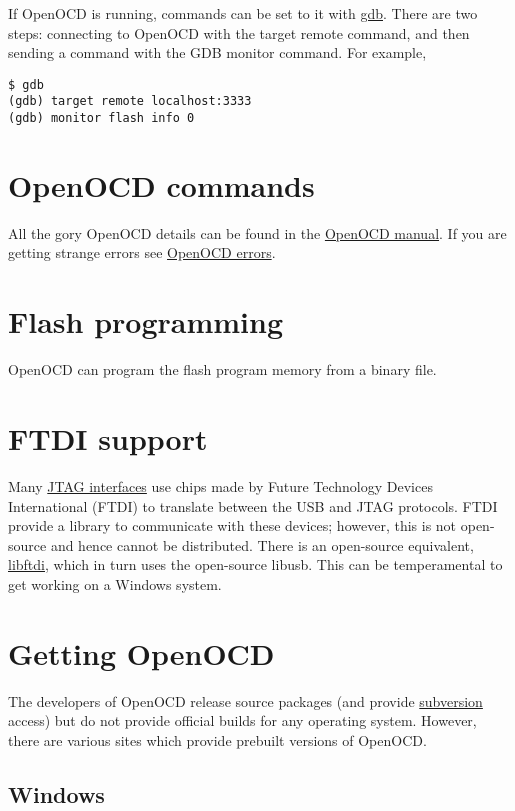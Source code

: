 If OpenOCD is running, commands can be set to it with \url{gdb}. There
are two steps: connecting to OpenOCD with the target remote command, and
then sending a command with the GDB monitor command. For example,

\begin{verbatim}
$ gdb
(gdb) target remote localhost:3333
(gdb) monitor flash info 0
\end{verbatim}

\section{OpenOCD commands}
\label{openocd-commands}

All the gory OpenOCD details can be found in the
\href{Media:openocd.pdf}{OpenOCD manual}. If you are getting strange
errors see \href{OpenOCD_errors}{OpenOCD errors}.

\section{Flash programming}
\label{flash-programming}

OpenOCD can program the flash program memory from a binary file.

\section{FTDI support}
\label{ftdi-support}

Many \href{JTAG_interface}{JTAG interfaces} use chips made by Future
Technology Devices International (FTDI) to translate between the USB and
JTAG protocols. FTDI provide a library to communicate with these
devices; however, this is not open-source and hence cannot be
distributed. There is an open-source equivalent,
\href{http://freshmeat.net/projects/libftdi/}{libftdi}, which in turn
uses the open-source libusb. This can be temperamental to get working on
a Windows system.

\section{Getting OpenOCD}
\label{getting-openocd}

The developers of OpenOCD release source packages (and provide
\url{subversion} access) but do not provide official builds for any
operating system. However, there are various sites which provide
prebuilt versions of OpenOCD.

\subsection{Windows}
\label{windows}

